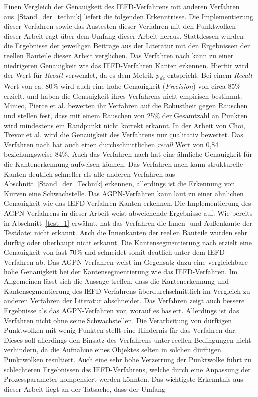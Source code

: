 Einen Vergleich der Genauigkeit des IEFD-Verfahrens mit anderen Verfahren aus~\ref{Stand_der_technik} liefert die folgenden Erkenntnisse. Die Implementierung dieser Verfahren sowie das Austesten dieser Verfahren mit den Punktwolken dieser Arbeit ragt über dem Umfang dieser Arbeit heraus. Stattdessen wurden die Ergebnisse der jeweiligen Beiträge aus der Literatur mit den Ergebnissen der reellen Bauteile dieser Arbeit verglichen. Das Verfahren nach \textcite[7353]{ahmed_edge_2018} kann zu einer niedrigeren Genauigkeit wie das IEFD-Verfahren Kanten erkennen. Hierfür wird der Wert für \textit{Recall} verwendet, da es dem Metrik \textit{p\textsubscript{dc}} entspricht. Bei einem \textit{Recall}-Wert von ca. 80\% wird auch eine hohe Genauigkeit (\textit{Precision}) von circa 85\% erzielt. \textcite[88]{mineo_novel_2019} und \textcite{choi_rgb-d_2013} haben die Genauigkeit ihres Verfahrens nicht empirisch bestimmt. Minieo, Pierce et al. bewerten ihr Verfahren auf die Robustheit gegen Rauschen und stellen fest, dass mit einem Rauschen von 25\% der Gesamtzahl an Punkten wird mindestens ein Randpunkt nicht korrekt erkannt. In der Arbeit von Choi, Trevor et al. wird die Genauigkeit des Verfahrens nur qualitativ bewertet. Das Verfahren nach \textcite[11]{bazazian_edc-net_2021} hat auch einen durchschnittlichen \textit{recall} Wert von 0,84 beziehungsweise 84\%. Auch das Verfahren nach \textcite[9]{himeur_pcednet_2021} hat eine ähnliche Genauigkeit für die Kantenerkennung aufweisen können. Das Verfahren nach \textcite{lu_fast_2019} kann strukturelle Kanten deutlich schneller als alle anderen Verfahren aus Abschnitt~\ref{Stand_der_Technik} erkennen, allerdings ist die Erkennung von Kurven eine Schwachstelle. Das AGPN-Verfahren kann laut \textcite{ni_edge_2016} zu einer ähnlichen Genauigkeit wie das IEFD-Verfahren Kanten erkennen. Die Implementierung des AGPN-Verfahrens in dieser Arbeit weist abweichende Ergebnisse auf. Wie bereits in Abschnitt~\ref{test_1} erwähnt, hat das Verfahren die Innen- und Außenkante der Testdatei nicht erkannt. Auch die Innenkanten der reellen Bauteile wurden sehr dürftig oder überhaupt nicht erkannt. Die Kantensegmentierung nach \textcite[234]{hu_jsenet_2020} erzielt eine Genauigkeit von fast 70\% und schneidet somit deutlich unter dem IEFD-Verfahren ab. Das AGPN-Verfahren weist im Gegensatz dazu eine vergleichbare hohe Genauigkeit bei der Kantensegmentierung wie das IEFD-Verfahren. Im Allgemeinen lässt sich die Aussage treffen, dass die Kantenerkennung und Kantensegmentierung des IEFD-Verfahrens überdurchschnittlich im Vergleich zu anderen Verfahren der Literatur abschneidet. Das Verfahren zeigt auch bessere Ergebnisse als das AGPN-Verfahren vor, worauf es basiert. Allerdings ist das Verfahren nicht ohne seine Schwachstellen. Die Verarbeitung von dürftigen Punktwolken mit wenig Punkten stellt eine Hindernis für das Verfahren dar. Dieses soll allerdings den Einsatz des Verfahrens unter reellen Bedingungen nicht verhindern, da die Aufnahme eines Objektes selten in solchen dürftigen Punktwolken resultiert. Auch eine sehr hohe Verzerrung der Punktwolke führt zu schlechteren Ergebnissen des IEFD-Verfahrens, welche durch eine Anpassung der Prozessparameter kompensiert werden könnten. Das wichtigste Erkenntnis aus dieser Arbeit liegt an der Tatsache, dass der Umfang 